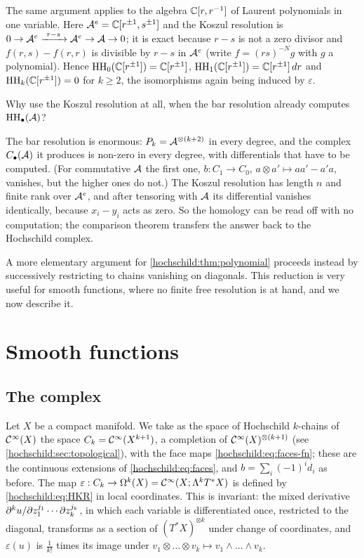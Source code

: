 \begin{remark}\label{hochschild:rem:Laurent}
The same argument applies to the algebra $\mathbb{C}[r,r^{-1}]$ of Laurent
polynomials in one variable. Here $\mathcal{A}^e=\mathbb{C}[r^{\pm1},s^{\pm1}]$ and the Koszul
resolution is $0\to\cA^e\xrightarrow{\ r-s\ }\cA^e\to\cA\to0$; it is exact
because $r-s$ is not a zero divisor and $f(r,s)-f(r,r)$ is divisible by $r-s$
in $\mathcal{A}^e$ (write $f=(rs)^{-N}g$ with $g$ a polynomial). Hence
$\operatorname{HH}_0(\mathbb{C}[r^{\pm1}])=\mathbb{C}[r^{\pm1}]$, $\operatorname{HH}_1(\mathbb{C}[r^{\pm1}])=\mathbb{C}[r^{\pm1}]\,dr$
and $\operatorname{HH}_k(\mathbb{C}[r^{\pm1}])=0$ for $k\ge2$, the isomorphisms again being
induced by $\varepsilon$.
\end{remark}

\begin{question}
Why use the Koszul resolution at all, when the bar resolution already
computes $\operatorname{HH}_\bullet(\mathcal{A})$?
\end{question}
\begin{answer}
The bar resolution is enormous: $P_k=\mathcal{A}^{\otimes(k+2)}$ in every degree,
and the complex $C_\bullet(\mathcal{A})$ it produces is non-zero in every
degree, with differentials that have to be computed. (For commutative $\mathcal{A}$
the first one, $b:C_1\to C_0$, $a\otimes a'\mapsto aa'-a'a$, vanishes, but the
higher ones do not.) The Koszul resolution has length $n$ and finite rank over
$\mathcal{A}^e$, and after tensoring with $\mathcal{A}$ its differential vanishes
identically, because $x_i-y_i$ acts as zero. So the homology can be read off
with no computation; the comparison theorem transfers the answer back to the
Hochschild complex.
\end{answer}

A more elementary argument for \cref{hochschild:thm:polynomial} proceeds
instead by successively restricting to chains vanishing on diagonals. This
reduction is very useful for smooth functions, where no finite free
resolution is at hand, and we now describe it.

\section{Smooth functions}\label{hochschild:sec:smooth}

\subsection{The complex}
Let $X$ be a compact manifold. We take as the space of Hochschild $k$-chains
of $\mathcal{C}^\infty(X)$ the space $C_k=\mathcal{C}^\infty(X^{k+1})$, a completion of
$\mathcal{C}^\infty(X)^{\otimes(k+1)}$ (see \cref{hochschild:sec:topological}), with the
face maps \eqref{hochschild:eq:faces-fn}; these are the continuous extensions
of \eqref{hochschild:eq:faces}, and $b=\sum_i(-1)^id_i$ as before. The map
$\varepsilon:C_k\to\Omega^k(X)=\mathcal{C}^\infty(X;\Lambda^kT^*X)$ is defined by
\eqref{hochschild:eq:HKR} in local coordinates. This is invariant: the
mixed derivative $\partial^k u/\partial z_1^{j_1}\cdots\partial z_k^{j_k}$, in which each
variable is differentiated once, restricted to the diagonal, transforms as a
section of $(T^*X)^{\otimes k}$ under change of coordinates, and
$\varepsilon(u)$ is $\frac1{k!}$ times its image under
$v_1\otimes\dots\otimes v_k\mapsto v_1\wedge\dots\wedge v_k$.

